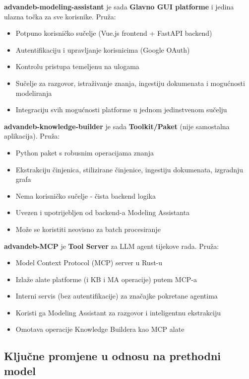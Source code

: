 \documentclass[12pt,a4paper]{article}
\begin{document}
\textbf{advandeb-modeling-assistant} je sada \textbf{Glavno GUI platforme} i jedina ulazna točka za sve korisnike. Pruža:
\begin{itemize}[noitemsep]
    \item Potpuno korisničko sučelje (Vue.js frontend + FastAPI backend)
    \item Autentifikaciju i upravljanje korisnicima (Google OAuth)
    \item Kontrolu pristupa temeljenu na ulogama
    \item Sučelje za razgovor, istraživanje znanja, ingestiju dokumenata i mogućnosti modeliranja
    \item Integraciju svih mogućnosti platforme u jednom jedinstvenom sučelju
\end{itemize}

\textbf{advandeb-knowledge-builder} je sada \textbf{Toolkit/Paket} (nije samostalna aplikacija). Pruža:
\begin{itemize}[noitemsep]
    \item Python paket s robusnim operacijama znanja
    \item Ekstrakciju činjenica, stilizirane činjenice, ingestiju dokumenata, izgradnju grafa
    \item Nema korisničko sučelje - čista backend logika
    \item Uvezen i upotrijebljen od backend-a Modeling Assistanta
    \item Može se koristiti neovisno za batch procesiranje
\end{itemize}

\textbf{advandeb-MCP} je \textbf{Tool Server} za LLM agent tijekove rada. Pruža:
\begin{itemize}[noitemsep]
    \item Model Context Protocol (MCP) server u Rust-u
    \item Izlaže alate platforme (i KB i MA operacije) putem MCP-a
    \item Interni servis (bez autentifikacije) za značajke pokretane agentima
    \item Koristi ga Modeling Assistant za razgovor i inteligentnu ekstrakciju
    \item Omotava operacije Knowledge Buildera kao MCP alate
\end{itemize}

\subsection{Ključne promjene u odnosu na prethodni model}
\end{document}

